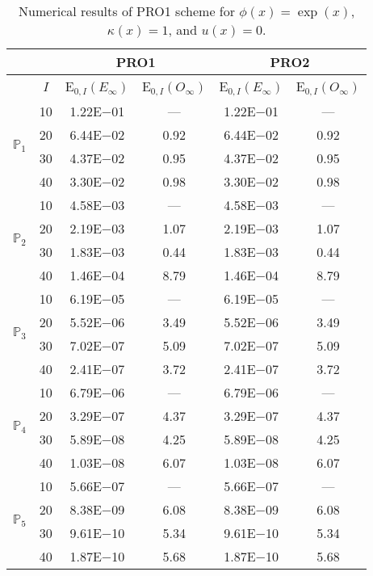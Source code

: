 \begin{table}[H]
\caption{Numerical results of PRO1 scheme for $\phi(x)=\exp(x)$, $\kappa(x)=1$, and $u(x)=0$.}
\setlength{\tabcolsep}{5pt}
\centering
\begin{tabular}{@{}l c c c c c@{}}
\toprule
 &  & \multicolumn{2}{c}{PRO1} & \multicolumn{2}{c}{PRO2}\\
\midrule
 & $I$ & E$_{0,I}(E_{\infty})$ & E$_{0,I}(O_{\infty})$ & E$_{0,I}(E_{\infty})$ & E$_{0,I}(O_{\infty})$\\
\midrule
\multirow{4}{*}{$\mathbb{P}_{1}$}
 & 10 & 1.22E$-$01 & --- & 1.22E$-$01 & ---\\
 & 20 & 6.44E$-$02 & 0.92 & 6.44E$-$02 & 0.92 \\
 & 30 & 4.37E$-$02 & 0.95 & 4.37E$-$02 & 0.95 \\
 & 40 & 3.30E$-$02 & 0.98 & 3.30E$-$02 & 0.98 \\
\midrule
\multirow{4}{*}{$\mathbb{P}_{2}$}
 & 10 & 4.58E$-$03 & --- & 4.58E$-$03 & ---\\
 & 20 & 2.19E$-$03 & 1.07 & 2.19E$-$03 & 1.07 \\
 & 30 & 1.83E$-$03 & 0.44 & 1.83E$-$03 & 0.44 \\
 & 40 & 1.46E$-$04 & 8.79 & 1.46E$-$04 & 8.79 \\
\midrule
\multirow{4}{*}{$\mathbb{P}_{3}$}
 & 10 & 6.19E$-$05 & --- & 6.19E$-$05 & ---\\
 & 20 & 5.52E$-$06 & 3.49 & 5.52E$-$06 & 3.49 \\
 & 30 & 7.02E$-$07 & 5.09 & 7.02E$-$07 & 5.09 \\
 & 40 & 2.41E$-$07 & 3.72 & 2.41E$-$07 & 3.72 \\
\midrule
\multirow{4}{*}{$\mathbb{P}_{4}$}
 & 10 & 6.79E$-$06 & --- & 6.79E$-$06 & ---\\
 & 20 & 3.29E$-$07 & 4.37 & 3.29E$-$07 & 4.37 \\
 & 30 & 5.89E$-$08 & 4.25 & 5.89E$-$08 & 4.25 \\
 & 40 & 1.03E$-$08 & 6.07 & 1.03E$-$08 & 6.07 \\
\midrule
\multirow{4}{*}{$\mathbb{P}_{5}$}
 & 10 & 5.66E$-$07 & --- & 5.66E$-$07 & ---\\
 & 20 & 8.38E$-$09 & 6.08 & 8.38E$-$09 & 6.08 \\
 & 30 & 9.61E$-$10 & 5.34 & 9.61E$-$10 & 5.34 \\
 & 40 & 1.87E$-$10 & 5.68 & 1.87E$-$10 & 5.68 \\
\bottomrule
\end{tabular}
\label{Table:PRO:Test1}
\end{table}
